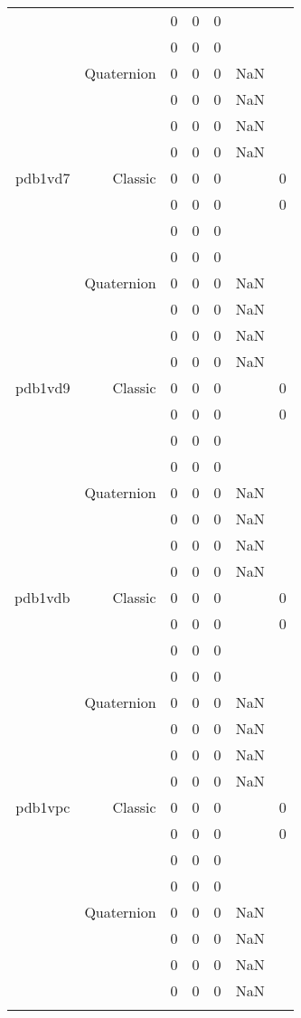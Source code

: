 \begin{xltabular}{\textwidth}{r|rcccSc}
& & 0 & 0 & 0 & & \\
& & 0 & 0 & 0 & & \\
& Quaternion & 0 & 0 & 0 & NaN & \\
& & 0 & 0 & 0 & NaN & \\
& & 0 & 0 & 0 & NaN & \\
& & 0 & 0 & 0 & NaN & \\ \addlinespace
pdb1vd7 & Classic & 0 & 0 & 0 & & 0 \\
& & 0 & 0 & 0 & & 0 \\
& & 0 & 0 & 0 & & \\
& & 0 & 0 & 0 & & \\
& Quaternion & 0 & 0 & 0 & NaN & \\
& & 0 & 0 & 0 & NaN & \\
& & 0 & 0 & 0 & NaN & \\
& & 0 & 0 & 0 & NaN & \\ \addlinespace
pdb1vd9 & Classic & 0 & 0 & 0 & & 0 \\
& & 0 & 0 & 0 & & 0 \\
& & 0 & 0 & 0 & & \\
& & 0 & 0 & 0 & & \\
& Quaternion & 0 & 0 & 0 & NaN & \\
& & 0 & 0 & 0 & NaN & \\
& & 0 & 0 & 0 & NaN & \\
& & 0 & 0 & 0 & NaN & \\ \addlinespace
pdb1vdb & Classic & 0 & 0 & 0 & & 0 \\
& & 0 & 0 & 0 & & 0 \\
& & 0 & 0 & 0 & & \\
& & 0 & 0 & 0 & & \\
& Quaternion & 0 & 0 & 0 & NaN & \\
& & 0 & 0 & 0 & NaN & \\
& & 0 & 0 & 0 & NaN & \\
& & 0 & 0 & 0 & NaN & \\ \addlinespace
pdb1vpc & Classic & 0 & 0 & 0 & & 0 \\
& & 0 & 0 & 0 & & 0 \\
& & 0 & 0 & 0 & & \\
& & 0 & 0 & 0 & & \\
& Quaternion & 0 & 0 & 0 & NaN & \\
& & 0 & 0 & 0 & NaN & \\
& & 0 & 0 & 0 & NaN & \\
& & 0 & 0 & 0 & NaN & \\ \addlinespace

\end{xltabular}
